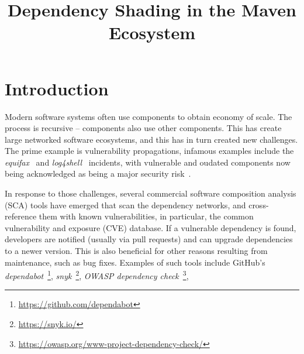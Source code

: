 \documentclass{article}
\begin{document}
\title{Dependency Shading in the Maven Ecosystem}


\maketitle


\section{Introduction}


Modern software systems often use components to obtain economy of scale. The process is recursive -- components also use other components. This has create large networked software ecosystems, and this has in turn created new challenges. The prime example is vulnerability propagations, infamous examples include the \textit{equifax}~\cite{CVE-2017-5638,luszcz2018apache} and \textit{log4shell}~\cite{CVE-2021-44228,hiesgen2022race} incidents, with vulnerable and oudated components now being acknowledged as being a major security risk~\cite{owaspTop10A06}. 

In response to those challenges, several commercial software composition analysis (SCA)  tools have emerged that scan the dependency networks, and cross-reference them with known vulnerabilities, in particular, the common vulnerability and exposure (CVE) database. If a vulnerable dependency is found, developers are notified (usually via pull requests) and can upgrade dependencies to a newer version. This is also beneficial for other reasons resulting from maintenance, such as bug fixes. Examples of such tools include GitHub's \textit{dependabot}~\footnote{\url{https://github.com/dependabot}}, \textit{snyk}~\footnote{\url{https://snyk.io/}},
\textit{OWASP dependency check}~\footnote{\url{https://owasp.org/www-project-dependency-check/}}, 
\end{document}
